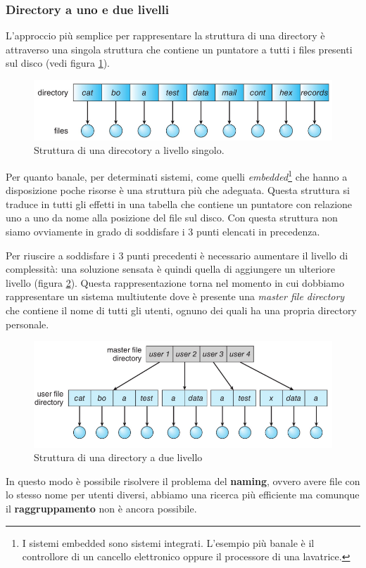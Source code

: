 \subsubsection{Directory a uno e due livelli}
L'approccio più semplice per rappresentare la struttura di una directory è attraverso una singola struttura che contiene un puntatore a tutti i files presenti sul disco (vedi figura \ref{fig:single-level dir}).
\begin{figure}[h]
    \centering
    \includegraphics[width = .7\textwidth]{../res/imgs/file system interface/single-level dir.png}
    \caption{Struttura di una direcotory a livello singolo.}
    \label{fig:single-level dir}
\end{figure}
Per quanto banale, per determinati sistemi, come quelli \textit{embedded}\footnote{I sistemi embedded sono sistemi integrati. L'esempio più banale è il controllore di un cancello elettronico oppure il processore di una lavatrice.} che hanno a disposizione poche risorse è una struttura più che adeguata. Questa struttura si traduce in tutti gli effetti in una tabella che contiene un puntatore con relazione uno a uno da nome alla posizione del file sul disco. Con questa struttura non siamo ovviamente in grado di soddisfare i 3 punti elencati in precedenza.

Per riuscire a soddisfare i 3 punti precedenti è necessario aumentare il livello di complessità: una soluzione sensata è quindi quella di aggiungere un ulteriore livello (figura \ref{fig:two-level dir}). Questa rappresentazione torna nel momento in cui dobbiamo rappresentare un sistema multiutente dove è presente una \textit{master file directory} che contiene il nome di tutti gli utenti, ognuno dei quali ha una propria directory personale.
\begin{figure}[h]
    \centering
    \includegraphics[width = .65\textwidth]{../res/imgs/file system interface/two-level dir.png}
    \caption{Struttura di una directory a due livello}
    \label{fig:two-level dir}
\end{figure}
In questo modo è possibile risolvere il problema del \textbf{naming}, ovvero avere file con lo stesso nome per utenti diversi, abbiamo una ricerca più efficiente ma comunque il \textbf{raggruppamento} non è ancora possibile.

